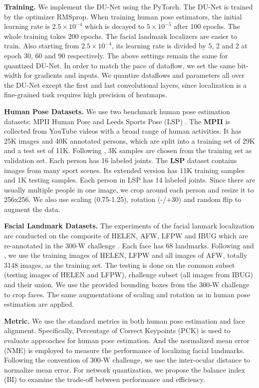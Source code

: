 \documentclass[runningheads]{llncs}
\begin{document}
{\bf Training.} We implement the DU-Net using the PyTorch. The DU-Net is trained by the optimizer RMSprop. When training human pose estimators, the initial learning rate is $2.5\times 10^{-4}$ which is decayed to $5\times 10^{-5}$ after 100 epochs. The whole training takes 200 epochs. The facial landmark localizers are easier to train. Also starting from $2.5\times 10^{-4}$, its learning rate is divided by 5, 2 and 2 at epoch 30, 60 and 90 respectively. The above settings remain the same for quantized
DU-Net. In order to match the pace of dataflow, we set the same bit-width for gradients and inputs. We quantize dataflows and parameters all over the DU-Net except the first and last convolutional layers, since localization is a fine-grained task requires high precision of heatmaps.

{\bf Human Pose Datasets.} We use two benchmark human pose estimation datasets: MPII Human Pose \cite{andriluka14cvpr} and Leeds Sports Pose (LSP) \cite{johnson2010lsp}. The {\bf MPII} is collected from YouTube videos with a broad range of human activities. It has 25K images and 40K annotated persons, which are split into a training set of 29K and a test set of 11K. Following \cite{tompson2015efficient}, 3K samples are chosen from the training set as validation set. Each person has 16 labeled joints. The {\bf LSP} dataset contains images from many sport scenes. Its extended version has 11K training samples and 1K testing samples. Each person in LSP has 14 labeled joints. Since there are usually multiple people in one image, we crop around each person and resize it to 256x256. We also use scaling (0.75-1.25), rotation (-/+30) and random flip to augment the data.

{\bf Facial Landmark Datasets.} The experiments of the facial lanmark localization are conducted on the composite of HELEN, AFW, LFPW and IBUG which are re-annotated in the 300-W challenge \cite{sagonas2013300}. Each face has 68 landmarks. Following \cite{zhu2015face} and \cite{lv2017deep}, we use the training images of HELEN, LFPW and all images of AFW, totally 3148 images, as the training set. The testing is done on the common subset (testing images of HELEN and LFPW), challenge subset (all images from IBUG) and their union. We use the provided bounding boxes from the 300-W challenge to crop faces. The same augmentations of scaling and rotation as in human pose estimation are applied.

{\bf Metric.} We use the standard metrics in both human pose estimation and face alignment. Specifically, Percentage of Correct Keypoints (PCK) is used to evaluate approaches for human pose estimation. And the normalized mean error (NME) is employed to measure the performance of localizing facial landmarks. Following the convention of 300-W challenge, we use the inter-ocular distance to normalize mean error. For network quantization, we propose the balance index (BI) to examine the trade-off between performance and efficiency.
\end{document}
